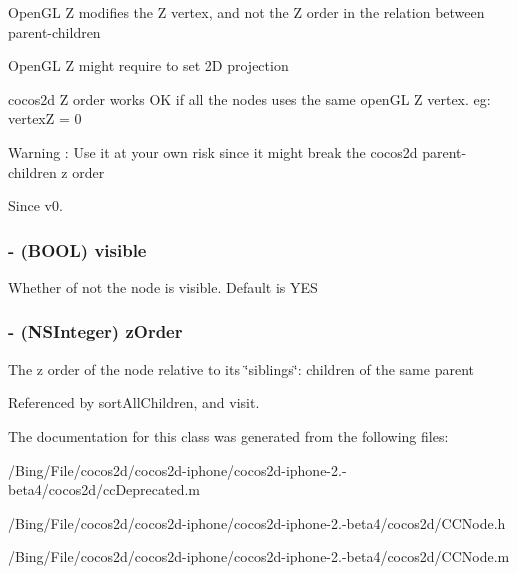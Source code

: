 \begin{DoxyItemize}
\item Open\-G\-L Z modifies the Z vertex, and not the Z order in the relation between parent-\/children
\item Open\-G\-L Z might require to set 2\-D projection
\item cocos2d Z order works O\-K if all the nodes uses the same open\-G\-L Z vertex. eg\-: vertex\-Z = 0 \begin{DoxyWarning}{Warning}
\-: Use it at your own risk since it might break the cocos2d parent-\/children z order 
\end{DoxyWarning}
\begin{DoxySince}{Since}
v0. 
\end{DoxySince}

\end{DoxyItemize}\hypertarget{class_c_c_node_a5385156c1a45907c9dff7dfb06e70b45}{
\subsubsection[{visible}]{\setlength{\rightskip}{0pt plus 5cm}-\/ (B\-O\-O\-L) {\bf visible}}}\label{class_c_c_node_a5385156c1a45907c9dff7dfb06e70b45}
Whether of not the node is visible. Default is Y\-E\-S \hypertarget{class_c_c_node_a21434541d824d49ea4e84019f1445727}{
\subsubsection[{z\-Order}]{\setlength{\rightskip}{0pt plus 5cm}-\/ (N\-S\-Integer) {\bf z\-Order}}}\label{class_c_c_node_a21434541d824d49ea4e84019f1445727}
The z order of the node relative to its \char`\"{}siblings\char`\"{}\-: children of the same parent 

Referenced by sort\-All\-Children, and visit.



The documentation for this class was generated from the following files\-:\begin{DoxyCompactItemize}
\item 
/\-Bing/\-File/cocos2d/cocos2d-\/iphone/cocos2d-\/iphone-\/2.-\/beta4/cocos2d/cc\-Deprecated.\-m\item 
/\-Bing/\-File/cocos2d/cocos2d-\/iphone/cocos2d-\/iphone-\/2.-\/beta4/cocos2d/C\-C\-Node.\-h\item 
/\-Bing/\-File/cocos2d/cocos2d-\/iphone/cocos2d-\/iphone-\/2.-\/beta4/cocos2d/C\-C\-Node.\-m\end{DoxyCompactItemize}
